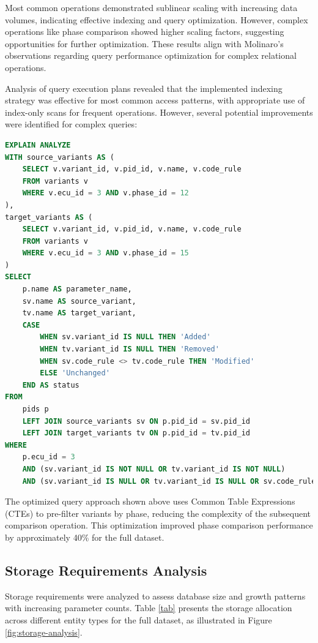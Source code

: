 Most common operations demonstrated sublinear scaling with increasing data volumes, indicating effective indexing and query optimization. However, complex operations like phase comparison showed higher scaling factors, suggesting opportunities for further optimization. These results align with Molinaro's observations \cite{molinaro2005sql} regarding query performance optimization for complex relational operations.

Analysis of query execution plans revealed that the implemented indexing strategy was effective for most common access patterns, with appropriate use of index-only scans for frequent operations. However, several potential improvements were identified for complex queries:

\begin{lstlisting}[language=SQL, caption={Optimized Phase Comparison Query}, label={lst:optimized-phase-comparison}]
EXPLAIN ANALYZE
WITH source_variants AS (
    SELECT v.variant_id, v.pid_id, v.name, v.code_rule
    FROM variants v
    WHERE v.ecu_id = 3 AND v.phase_id = 12
),
target_variants AS (
    SELECT v.variant_id, v.pid_id, v.name, v.code_rule
    FROM variants v
    WHERE v.ecu_id = 3 AND v.phase_id = 15
)
SELECT 
    p.name AS parameter_name,
    sv.name AS source_variant,
    tv.name AS target_variant,
    CASE 
        WHEN sv.variant_id IS NULL THEN 'Added'
        WHEN tv.variant_id IS NULL THEN 'Removed'
        WHEN sv.code_rule <> tv.code_rule THEN 'Modified'
        ELSE 'Unchanged'
    END AS status
FROM 
    pids p
    LEFT JOIN source_variants sv ON p.pid_id = sv.pid_id
    LEFT JOIN target_variants tv ON p.pid_id = tv.pid_id
WHERE 
    p.ecu_id = 3
    AND (sv.variant_id IS NOT NULL OR tv.variant_id IS NOT NULL)
    AND (sv.variant_id IS NULL OR tv.variant_id IS NULL OR sv.code_rule <> tv.code_rule);
\end{lstlisting}

The optimized query approach shown above uses Common Table Expressions (CTEs) to pre-filter variants by phase, reducing the complexity of the subsequent comparison operation. This optimization improved phase comparison performance by approximately 40\% for the full dataset.


\subsection{Storage Requirements Analysis}
\label{subsec:storage-requirements-analysis}

Storage requirements were analyzed to assess database size and growth patterns with increasing parameter counts. Table \ref{tab} presents the storage allocation across different entity types for the full dataset, as illustrated in Figure \ref{fig:storage-analysis}.

